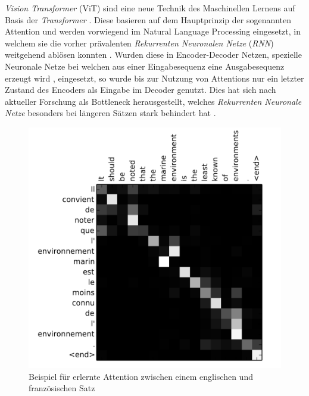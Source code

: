 \documentclass[twoside,a4paper]{IEEEtran}
\begin{document}
\emph{Vision Transformer} (ViT) sind eine neue Technik des Maschinellen Lernens auf Basis der \emph{Transformer} \cite{TRANSFORMERS}. Diese basieren auf dem Hauptprinzip der sogenannten Attention und werden vorwiegend im Natural Language Processing eingesetzt, in welchem sie die vorher prävalenten \emph{Rekurrenten Neuronalen Netze} (\emph{RNN}) weitgehend ablösen konnten \cite{TRANSFORMERS}. Wurden diese in Encoder-Decoder Netzen, spezielle Neuronale Netze bei welchen aus einer Eingabesequenz eine Ausgabesequenz erzeugt wird \cite[S.388-389]{MACHINE_LEARNING}, eingesetzt, so wurde bis zur Nutzung von Attentions nur ein letzter Zustand des Encoders als Eingabe im Decoder genutzt. Dies hat sich nach aktueller Forschung als Bottleneck herausgestellt, welches \emph{Rekurrenten Neuronale Netze} besonders bei längeren Sätzen stark behindert hat \cite[S.2]{TRANSFORMERS}. 

\begin{figure}[!htb]
	\includegraphics[width=\columnwidth]{attention_visualized}
	\caption{Beispiel für erlernte Attention zwischen einem englischen und französischen Satz \cite[S.6]{RNN_ATTENTION}}
	\label{bildAttention}
\end{figure}
\end{document}
